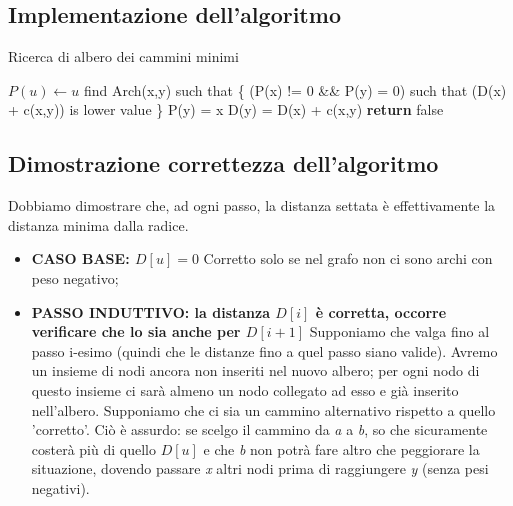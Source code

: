 \subsection{Implementazione dell'algoritmo}
\begin{algorithm}
    \caption{Ricerca di albero dei cammini minimi}\label{alg:ACM}
    \begin{algorithmic}[1]
            \State $P(u) \gets u$  
                \State find Arch(x,y) such that \{
                \State (P(x) != 0 \&\& P(y) = 0) such that 
                \State (D(x) + c(x,y)) is lower value 
                \State \}
                \State P(y) = x
                \State D(y) = D(x) + c(x,y)
            \EndFor
            \State \textbf{return} false\Comment{}
        \EndFunction
    \end{algorithmic}
\end{algorithm}

\subsection{Dimostrazione correttezza dell'algoritmo}
Dobbiamo dimostrare che, ad ogni passo, la distanza settata è effettivamente la distanza minima dalla radice.
\begin{itemize}
    \item \textbf{CASO BASE: $ D[u] = 0 $}
        Corretto solo se nel grafo non ci sono archi con peso negativo;
    \item \textbf{PASSO INDUTTIVO: la distanza $D[i]$ è corretta, occorre verificare che lo sia anche per $D[i+1]$}
        Supponiamo che valga fino al passo i-esimo (quindi che le distanze fino a quel passo siano valide). Avremo un insieme di nodi ancora non inseriti nel nuovo albero; per ogni nodo di questo insieme ci sarà almeno un nodo collegato ad esso e già inserito nell'albero. Supponiamo che ci sia un cammino alternativo rispetto a quello 'corretto'. Ciò è assurdo: se scelgo il cammino da \textit{a} a \textit{b}, so che sicuramente costerà più di quello $D[u]$ e che \textit{b} non potrà fare altro che peggiorare la situazione, dovendo passare \textit{x} altri nodi prima di raggiungere \textit{y} (senza pesi negativi).
\end{itemize}

